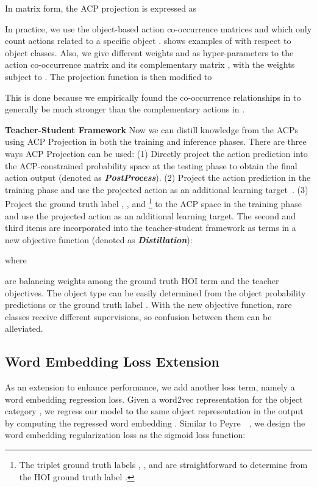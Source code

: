 In matrix form, the ACP projection is expressed as




In practice, we use the object-based action co-occurrence matrices  and  which only count actions related to a specific object .  shows examples of  with respect to object classes.
Also, we give different weights  and  {as hyper-parameters} to the action co-occurrence matrix  and its complementary matrix , with the weights subject to .
The projection function is then modified to

This is done because we empirically found the co-occurrence relationships in  to generally be much stronger than the complementary actions in . 


\noindent\textbf{Teacher-Student Framework} Now we can distill knowledge from the ACPs using ACP Projection in both the training and inference phases. There are three ways ACP Projection can be used:
(1) Directly project the action prediction  into the ACP-constrained probability space at the testing phase to obtain the final action output (denoted as \emph{\textbf{PostProcess}}). 
(2) Project the action prediction  in the training phase and use the projected action as an additional learning target~\cite{hu2016harnessing,yu2017visual}.
(3) Project the ground truth label , , and \footnote{The triplet ground truth labels , , and  are straightforward to determine from the HOI ground truth label .} to the ACP space in the training phase and use the projected action  as an additional learning target.
The second and third items are incorporated into the teacher-student framework as terms in a new objective function {(denoted as \emph{\textbf{Distillation}})}:

where


 are balancing weights among the ground truth HOI term and the teacher objectives.
The object type can be easily determined from the object probability predictions  or the ground truth label .
With the new objective function, rare classes receive different supervisions, so confusion between them can be alleviated.






\subsection{Word Embedding Loss Extension}
\label{sec.language}
As an extension to enhance performance, we add another loss term, namely a word embedding regression loss.
Given a word2vec representation for the object category , we regress our model to the same object representation in the output by computing the regressed word embedding . 
Similar to Peyre~\etal~\cite{peyre2019detecting}, we design the word embedding regularization loss as the sigmoid loss function:

